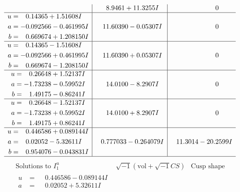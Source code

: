 \documentclass[1p]{elsarticle_modified}
\theoremstyle{definition}
\newcommand{\I}{\sqrt{-1}}
\begin{document}
$$\begin{array}{c|c|c}
 & \phantom{-}8.9461 + 11.3255 I & \phantom{-0.000000 } 0 \\ \hline\begin{aligned}
u &= \phantom{-}0.14365 + 1.51608 I \\
a &= -0.092566 - 0.461995 I \\
b &= \phantom{-}0.669674 + 1.208150 I\end{aligned}
 & \phantom{-}11.60390 - 0.05307 I & \phantom{-0.000000 } 0 \\ \hline\begin{aligned}
u &= \phantom{-}0.14365 - 1.51608 I \\
a &= -0.092566 + 0.461995 I \\
b &= \phantom{-}0.669674 - 1.208150 I\end{aligned}
 & \phantom{-}11.60390 + 0.05307 I & \phantom{-0.000000 } 0 \\ \hline\begin{aligned}
u &= \phantom{-}0.26648 + 1.52137 I \\
a &= -1.73238 - 0.59952 I \\
b &= \phantom{-}1.49175 - 0.86241 I\end{aligned}
 & \phantom{-}14.0100 - 8.2907 I & \phantom{-0.000000 } 0 \\ \hline\begin{aligned}
u &= \phantom{-}0.26648 - 1.52137 I \\
a &= -1.73238 + 0.59952 I \\
b &= \phantom{-}1.49175 + 0.86241 I\end{aligned}
 & \phantom{-}14.0100 + 8.2907 I & \phantom{-0.000000 } 0 \\ \hline\begin{aligned}
u &= \phantom{-}0.446586 + 0.089144 I \\
a &= \phantom{-}0.02052 - 5.32611 I \\
b &= \phantom{-}0.954076 - 0.043831 I\end{aligned}
 & \phantom{-}0.777033 - 0.264079 I & \phantom{-}11.3014 - 20.2599 I\\
 \hline 
 \end{array}$$\newpage$$\begin{array}{c|c|c}  
\text{Solutions to }I^u_{1}& \I (\text{vol} + \sqrt{-1}CS) & \text{Cusp shape}\\
 \hline 
\begin{aligned}
u &= \phantom{-}0.446586 - 0.089144 I \\
a &= \phantom{-}0.02052 + 5.32611 I \\

\end{aligned}
\end{array}$$
\end{document}
